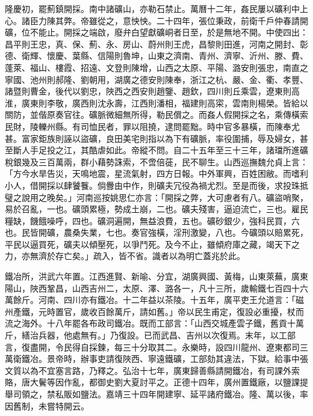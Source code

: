 隆慶初，罷薊鎮開採。南中諸礦山，亦勒石禁止。萬曆十二年，姦民屢以礦利中上心。諸臣力陳其弊。帝雖從之，意怏怏。二十四年，張位秉政，前衛千戶仲春請開礦，位不能止。開採之端啟，廢弁白望獻礦峒者日至，於是無地不開。中使四出：昌平則王忠，真、保、薊、永、房山、蔚州則王虎，昌黎則田進，河南之開封、彰德、衛輝、懷慶、葉縣、信陽則魯坤，山東之濟南、青州、濟寧、沂州、滕、費、蓬萊、福山、樓霞、招遠、文登則陳增，山西之太原、平陽、潞安則張忠，南直之寧國、池州則郝隆、劉朝用，湖廣之德安則陳奉，浙江之杭、嚴、金、衢、孝豐、諸暨則曹金，後代以劉忠，陜西之西安則趙鑒、趙欽，四川則丘乘雲，遼東則高淮，廣東則李敬，廣西則沈永壽，江西則潘相，福建則高寀，雲南則楊榮。皆給以關防，並偕原奏官往。礦脈微細無所得，勒民償之。而姦人假開採之名，乘傳橫索民財，陵轢州縣。有司恤民者，罪以阻撓，逮問罷黜。時中官多暴橫，而陳奉尤甚。富家鉅族則誣以盜礦，良田美宅則指以為下有礦脈，率役圍捕，辱及婦女，甚至斷人手足投之江，其酷虐如此。帝縱不問。自二十五年至三十三年，諸璫所進礦稅銀幾及三百萬兩，群小藉勢誅索，不啻倍蓰，民不聊生。山西巡撫魏允貞上言：「方今水旱告災，天鳴地震，星流氣射，四方日報。中外軍興，百姓困敝。而嗜利小人，借開採以肆饕餮。倘釁由中作，則礦夫冗役為禍尤烈。至是而後，求投珠抵璧之說用之晚矣。」河南巡按姚思仁亦言：「開採之弊，大可慮者有八。礦盜哨聚，易於召亂，一也。礦頭累極，勢成土崩，二也。礦夫殘害，逼迫流亡，三也。雇民糧缺，饑餓噪呼，四也。礦洞遍開，無益浪費，五也。礦砂銀少，強科民買，六也。民皆開礦，農桑失業，七也。奏官強橫，淫刑激變，八也。今礦頭以賠累死，平民以逼買死，礦夫以傾壓死，以爭鬥死。及今不止，雖傾府庫之藏，竭天下之力，亦無濟於存亡矣。」疏入，皆不省。識者以為明亡蓋兆於此。

鐵冶所，洪武六年置。江西進賢、新喻、分宜，湖廣興國、黃梅，山東萊蕪，廣東陽山，陜西鞏昌，山西吉州二，太原、澤、潞各一，凡十三所，歲輸鐵七百四十六萬餘斤。河南、四川亦有鐵冶。十二年益以茶陵。十五年，廣平吏王允道言：「磁州產鐵，元時置官，歲收百餘萬斤，請如舊。」帝以民生甫定，復設必重擾，杖而流之海外。十八年罷各布政司鐵冶。既而工部言：「山西交城產雲子鐵，舊貢十萬斤，繕治兵器，他處無有。」乃復設。已而武昌、吉州以次復焉。末年，以工部言，復盡開，令民得自採鍊，每三十分取其二。永樂時，設四川龍州、遼東都司三萬衛鐵冶。景帝時，辦事吏請復陜西、寧遠鐵礦，工部劾其違法，下獄。給事中張文質以為不宜塞言路，乃釋之。弘治十七年，廣東歸善縣請開鐵冶，有司課外索賂，唐大鬢等因作亂，都御史劉大夏討平之。正德十四年，廣州置鐵廠，以鹽課提舉司領之，禁私販如鹽法。嘉靖三十四年開建寧、延平諸府鐵冶。隆、萬以後，率因舊制，未嘗特開云。

